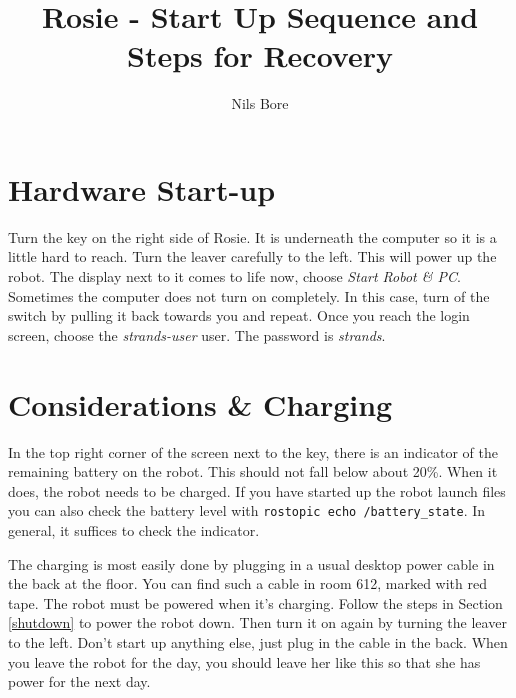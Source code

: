 \documentclass[a4paper,11pt]{article}
\title{Rosie - Start Up Sequence and Steps for Recovery}
\author{Nils Bore}
\begin{document}

\maketitle

\tableofcontents
\newpage

\section{Hardware Start-up}

Turn the key on the right side of Rosie. It is underneath the computer so it is a little hard to reach. Turn the leaver carefully to the left. This will power up the robot. The display next to it comes to life now, choose \textit{Start Robot \& PC}. Sometimes the computer does not turn on completely. In this case, turn of the switch by pulling it back towards you and repeat. Once you reach the login screen, choose the \textit{strands-user} user. The password is \textit{strands}.

\section{Considerations \& Charging}
\label{considerations}

In the top right corner of the screen next to the key, there is an indicator of the
remaining battery on the robot. This should not fall below about 20\%. When it 
does, the robot needs to be charged. If you have started up the robot launch files 
you can also check the battery level with \texttt{rostopic echo /battery\_state}. 
In general, it suffices to check the indicator.

The charging is most easily done by plugging in a usual desktop power cable in the 
back at the floor. You can find such a cable in room 612, marked with red tape.
The robot must be powered when it's charging. Follow the steps in Section \ref{shutdown} to power the robot down. Then turn it on again by turning the
leaver to the left. Don't start up anything else, just plug in the cable in the back. When you leave the robot for the day, you should leave her like this
so that she has power for the next day.
\end{document}
